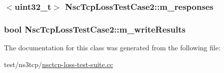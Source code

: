\subsubsection[{\texorpdfstring{m\+\_\+responses}{m_responses}}]{$<$uint32\+\_\+t$>$ Nsc\+Tcp\+Loss\+Test\+Case2\+::m\+\_\+responses\hspace{0.3cm}{\ttfamily [private]}}\hypertarget{classNscTcpLossTestCase2_ace5e314367a0b601262aaf186e172d30}{}\label{classNscTcpLossTestCase2_ace5e314367a0b601262aaf186e172d30}
\subsubsection[{\texorpdfstring{m\+\_\+write\+Results}{m_writeResults}}]{\setlength{\rightskip}{0pt plus 5cm}bool Nsc\+Tcp\+Loss\+Test\+Case2\+::m\+\_\+write\+Results\hspace{0.3cm}{\ttfamily [private]}}\hypertarget{classNscTcpLossTestCase2_a9a6f06deb7a2687aaa2feafbf7c39fa4}{}\label{classNscTcpLossTestCase2_a9a6f06deb7a2687aaa2feafbf7c39fa4}


The documentation for this class was generated from the following file\+:\begin{DoxyCompactItemize}
\item 
test/ns3tcp/\hyperlink{nsctcp-loss-test-suite_8cc}{nsctcp-\/loss-\/test-\/suite.\+cc}\end{DoxyCompactItemize}
